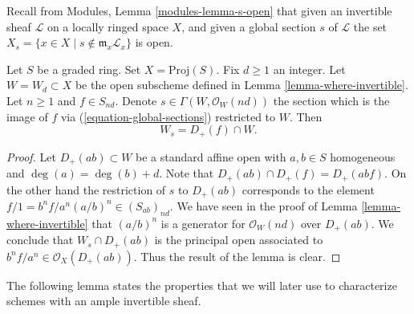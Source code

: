 \noindent
Recall from Modules, Lemma \ref{modules-lemma-s-open}
that given an invertible sheaf $\mathcal{L}$ on a locally ringed
space $X$, and given a global section $s$ of $\mathcal{L}$
the set $X_s = \{x \in X \mid s \not \in \mathfrak m_x\mathcal{L}_x\}$
is open.

\begin{lemma}
\label{lemma-principal-open}
Let $S$ be a graded ring. Set $X = \text{Proj}(S)$. Fix $d \geq 1$ an
integer. Let $W = W_d \subset X$ be the open subscheme defined in
Lemma \ref{lemma-where-invertible}. Let $n \geq 1$ and $f \in S_{nd}$.
Denote $s \in \Gamma(W, \mathcal{O}_W(nd))$ the section which is
the image of $f$ via (\ref{equation-global-sections}) restricted to $W$. Then
$$
W_s = D_{+}(f) \cap W.
$$
\end{lemma}

\begin{proof}
Let $D_{+}(ab) \subset W$ be a standard affine open with
$a, b \in S$ homogeneous and $\deg(a) = \deg(b) + d$.
Note that $D_{+}(ab) \cap D_{+}(f) = D_{+}(abf)$.
On the other hand the restriction of $s$ to $D_{+}(ab)$
corresponds to the element $f/1 = b^nf/a^n (a/b)^n \in (S_{ab})_{nd}$.
We have seen in the proof of Lemma \ref{lemma-where-invertible} that
$(a/b)^n$ is a generator for $\mathcal{O}_W(nd)$ over $D_{+}(ab)$.
We conclude that $W_s \cap D_{+}(ab)$ is the principal open
associated to $b^nf/a^n \in \mathcal{O}_X(D_{+}(ab))$.
Thus the result of the lemma is clear.
\end{proof}

\noindent
The following lemma states the properties that we will later use to
characterize schemes with an ample invertible sheaf.


